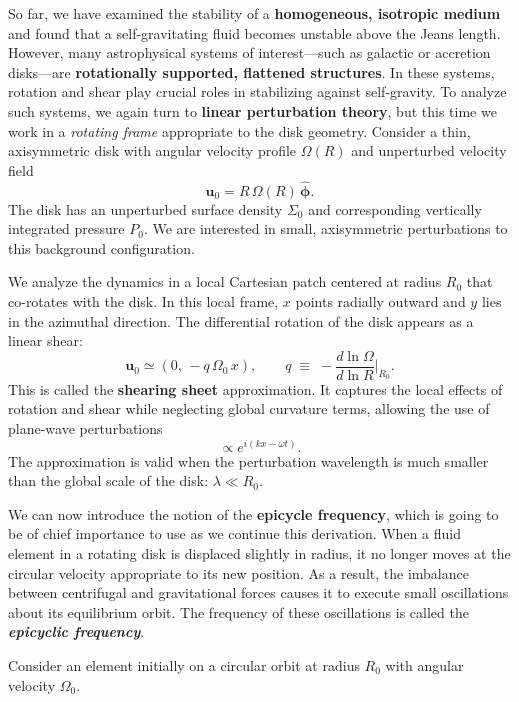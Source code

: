 So far, we have examined the stability of a \textbf{homogeneous, isotropic medium} and found that a self-gravitating fluid becomes unstable above the Jeans length.  However, many astrophysical systems of interest—such as galactic or accretion disks—are \textbf{rotationally supported, flattened structures}.  
In these systems, rotation and shear play crucial roles in stabilizing against self-gravity.  
To analyze such systems, we again turn to \textbf{linear perturbation theory}, but this time we work in a \emph{rotating frame} appropriate to the disk geometry.
\vspace{1em}
\noindent
Consider a thin, axisymmetric disk with angular velocity profile $\Omega(R)$ and unperturbed velocity field
\[
\mathbf{u}_0 = R\,\Omega(R)\,\hat{\boldsymbol{\phi}}.
\]
The disk has an unperturbed surface density $\Sigma_0$ and corresponding vertically integrated pressure $P_0$.  We are interested in small, axisymmetric perturbations to this background configuration.
\vspace{10pt}
\begin{definition}
We analyze the dynamics in a local Cartesian patch centered at radius $R_0$ that co-rotates with the disk.  
In this local frame, $x$ points radially outward and $y$ lies in the azimuthal direction.  
The differential rotation of the disk appears as a linear shear:
\[
\mathbf{u}_0 \simeq (0,\,-q\,\Omega_0\,x),
\qquad
q \;\equiv\; -\frac{d\ln\Omega}{d\ln R}\Big|_{R_0}.
\]
This is called the \textbf{shearing sheet} approximation.  
It captures the local effects of rotation and shear while neglecting global curvature terms, allowing the use of plane-wave perturbations 
\[
\propto e^{i(kx - \omega t)}.
\]
The approximation is valid when the perturbation wavelength is much smaller than the global scale of the disk: $\lambda \ll R_0$.
\end{definition}
\vspace{10pt}
We can now introduce the notion of the \textbf{epicycle frequency}, which is going to be of chief importance to use as we continue this derivation. When a fluid element in a rotating disk is displaced slightly in radius, it no longer moves at the circular velocity appropriate to its new position. As a result, the imbalance between centrifugal and gravitational forces causes it to execute small oscillations about its equilibrium orbit. The frequency of these oscillations is called the \emph{\textbf{epicyclic frequency}}.
\par
Consider an element initially on a circular orbit at radius $R_0$ with angular velocity $\Omega_0$.  
